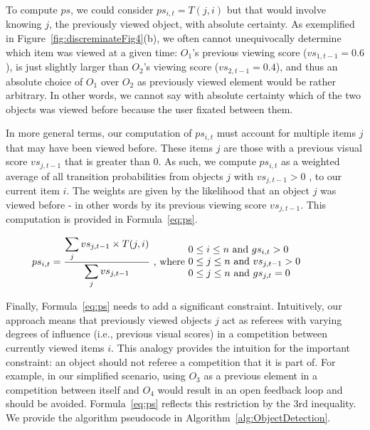 To compute $ps$, we could consider $ps_{i,t} = T(j,i)$ but that would involve knowing $j$, the previously viewed object, with absolute certainty. As exemplified in Figure~\ref{fig:discreminateFig4}(b), we often cannot unequivocally determine which item was viewed at a given time: $O_1$'s previous viewing score ($vs_{1,t-1}=0.6$), is just slightly larger than $O_2$'s viewing score ($vs_{2,t-1}=0.4$), and thus an absolute choice of $O_1$ over $O_2$ as previously viewed element would be rather arbitrary.  In other words, we cannot say with absolute certainty which of the two objects was viewed before because the user fixated between them. 

In more general terms, our computation of $ps_{i,t}$ must account for multiple items $j$ that may have been viewed before. These items $j$ are those with a previous visual score $vs_{j,t-1}$ that is greater than $0$.  As such, we compute $ps_{i,t}$ as a weighted average of all transition probabilities from objects $j$ with $vs_{j,t-1} > 0$ , to our current item $i$. The weights are given by the likelihood that an object $j$ was viewed before - in other words by its previous viewing score $vs_{j,t-1}$. This computation is provided in Formula~\ref{eq:ps}.  

\begin{equation}
ps_{i,t} = \frac{\displaystyle\sum_{j} {vs_{j,t-1} \times T(j,i)}}{\displaystyle\sum_{j} vs_{j,t-1}} \text{ , where  } \parbox{15em}{$0\leq i \leq n$ and $gs_{i,t} > 0$\\$0\leq j \leq n$ and $vs_{j,t-1} > 0 $\\ $0\leq j \leq n$ and $gs_{j,t} = 0$ }
\label{eq:ps}
\end{equation} 

Finally, Formula~\ref{eq:ps} needs to add a significant constraint. Intuitively, our approach means that previously viewed objects $j$ act as referees with varying degrees of influence (i.e., previous visual scores) in a competition between currently viewed items $i$. This analogy provides the intuition for the important constraint: an object should not referee a competition that it is part of. For example, in our simplified scenario, using $O_3$ as a previous element in a competition between itself and $O_4$ would result in an open feedback loop and should be avoided. Formula~\ref{eq:ps} reflects this restriction by the 3rd inequality.  We provide the algorithm pseudocode in Algorithm~\ref{alg:ObjectDetection}.

